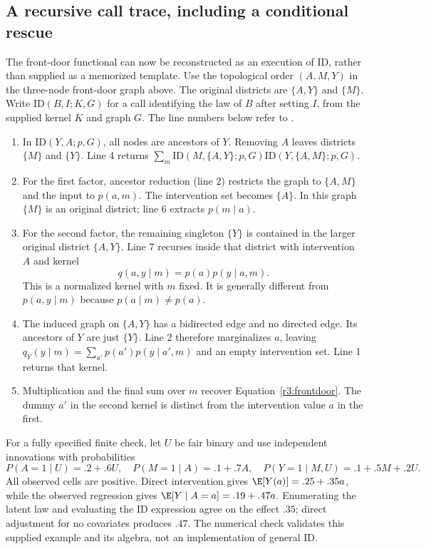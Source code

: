 \subsection{A recursive call trace, including a conditional rescue}
\label{r3:id-trace}
The front-door functional can now be reconstructed as an execution of
ID, rather than supplied as a memorized template. Use the topological
order $(A,M,Y)$ in the three-node front-door graph above. The original
districts are $\{A,Y\}$ and $\{M\}$. Write $\mathrm{ID}(B,I;K,G)$
for a call identifying the law of $B$ after setting $I$, from the supplied
kernel $K$ and graph $G$. The line numbers below refer to
\citet[Figure 2]{id2006}.
\begin{enumerate}
 \item In $\mathrm{ID}(Y,A;p,G)$, all nodes are ancestors of $Y$.
 Removing $A$ leaves districts $\{M\}$ and $\{Y\}$. Line 4 returns
 $\sum_m\mathrm{ID}(M,\{A,Y\};p,G)
             \mathrm{ID}(Y,\{A,M\};p,G)$.
 \item For the first factor, ancestor reduction (line 2) restricts the
 graph to $\{A,M\}$ and the input to $p(a,m)$. The intervention set
 becomes $\{A\}$. In this graph $\{M\}$ is an original district;
 line 6 extracts $p(m\mid a)$.
 \item For the second factor, the remaining singleton $\{Y\}$ is
 contained in the larger original district $\{A,Y\}$. Line 7 recurses
 inside that district with intervention $A$ and kernel
 \[
    q(a,y\mid m)=p(a)p(y\mid a,m).
 \]
 This is a normalized kernel with $m$ fixed. It is generally different
 from $p(a,y\mid m)$ because $p(a\mid m)\ne p(a)$.
 \item The induced graph on $\{A,Y\}$ has a bidirected edge and no
 directed edge. Its ancestors of $Y$ are just $\{Y\}$. Line 2
 therefore marginalizes $a$, leaving
 $q_Y(y\mid m)=\sum_{a'}p(a')p(y\mid a',m)$ and an empty
 intervention set. Line 1 returns that kernel.
 \item Multiplication and the final sum over $m$ recover
 Equation~\eqref{r3:frontdoor}. The dummy $a'$ in the second kernel
 is distinct from the intervention value $a$ in the first.
\end{enumerate}
For a fully specified finite check, let $U$ be fair binary and use
independent innovations with probabilities
\[
 P(A=1\mid U)=.2+.6U,\quad P(M=1\mid A)=.1+.7A,\quad
 P(Y=1\mid M,U)=.1+.5M+.2U.
\]
All observed cells are positive. Direct intervention gives
$\E[Y(a)]=.25+.35a$, while the observed regression gives
$\E[Y\mid A=a]=.19+.47a$. Enumerating the latent law and evaluating
the ID expression agree on the effect $.35$; direct adjustment for no
covariates produces $.47$. The numerical check validates this supplied
example and its algebra, not an implementation of general ID.

